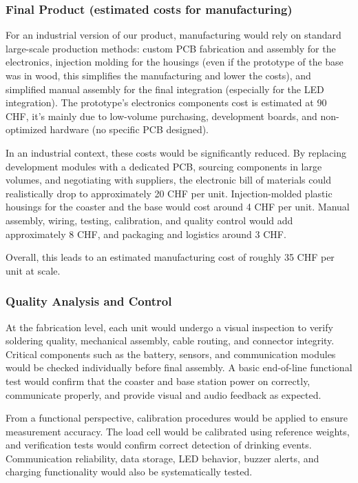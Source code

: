 \documentclass{article}
\begin{document}
\subsubsection{Final Product (estimated costs for manufacturing)}


For an industrial version of our product, manufacturing would rely on standard large-scale production methods: custom PCB fabrication and assembly for the electronics, injection molding for the housings (even if the prototype of the base was in wood, this simplifies the manufacturing and lower the costs), and simplified manual assembly for the final integration (especially for the LED integration). The prototype's electronics components cost is estimated at 90 CHF, it's mainly due to low-volume purchasing, development boards, and non-optimized hardware (no specific PCB designed).\vspace{0.2cm}

In an industrial context, these costs would be significantly reduced. By replacing development modules with a dedicated PCB, sourcing components in large volumes, and negotiating with suppliers, the electronic bill of materials could realistically drop to approximately 20 CHF per unit. Injection-molded plastic housings for the coaster and the base would cost around 4 CHF per unit. Manual assembly, wiring, testing, calibration, and quality control would add approximately 8 CHF, and packaging and logistics around 3 CHF.\vspace{0.2cm}

Overall, this leads to an estimated manufacturing cost of roughly 35 CHF per unit at scale. 

\subsubsection{Quality Analysis and Control}
At the fabrication level, each unit would undergo a visual inspection to verify soldering quality, mechanical assembly, cable routing, and connector integrity. Critical components such as the battery, sensors, and communication modules would be checked individually before final assembly. A basic end-of-line functional test would confirm that the coaster and base station power on correctly, communicate properly, and provide visual and audio feedback as expected.\vspace{0.2cm}

From a functional perspective, calibration procedures would be applied to ensure measurement accuracy. The load cell would be calibrated using reference weights, and verification tests would confirm correct detection of drinking events. Communication reliability, data storage, LED behavior, buzzer alerts, and charging functionality would also be systematically tested.\vspace{0.2cm}
\end{document}
